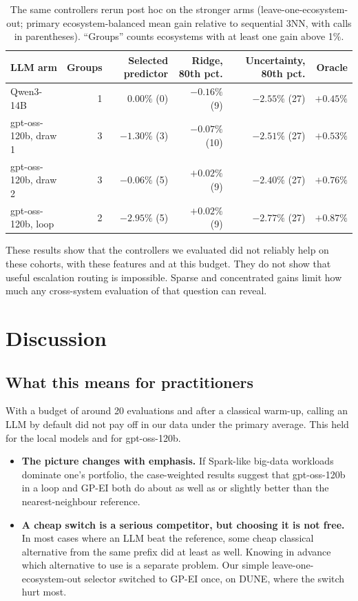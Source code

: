 \begin{table}[t]
\centering
\caption{The same controllers rerun post hoc on the stronger arms (leave-one-ecosystem-out; primary ecosystem-balanced mean gain relative to sequential 3NN, with calls in parentheses). ``Groups'' counts ecosystems with at least one gain above 1\%.}
\label{tab:routers-strong}
\small
\begin{tabular}{lrrrrr}
\toprule
LLM arm & Groups & Selected predictor & Ridge, 80th pct. & Uncertainty, 80th pct. & Oracle \\
\midrule
Qwen3-14B & 1 & $0.00\%$ (0) & $-0.16\%$ (9) & $-2.55\%$ (27) & $+0.45\%$ \\
gpt-oss-120b, draw 1 & 3 & $-1.30\%$ (3) & $-0.07\%$ (10) & $-2.51\%$ (27) & $+0.53\%$ \\
gpt-oss-120b, draw 2 & 3 & $-0.06\%$ (5) & $+0.02\%$ (9) & $-2.40\%$ (27) & $+0.76\%$ \\
gpt-oss-120b, loop & 2 & $-2.95\%$ (5) & $+0.02\%$ (9) & $-2.77\%$ (27) & $+0.87\%$ \\
\bottomrule
\end{tabular}
\end{table}

These results show that the controllers we evaluated did not reliably help on these cohorts, with these features and at this budget. They do not show that useful escalation routing is impossible. Sparse and concentrated gains limit how much any cross-system evaluation of that question can reveal.

\section{Discussion}

\subsection{What this means for practitioners}

With a budget of around 20 evaluations and after a classical warm-up, calling an LLM by default did not pay off in our data under the primary average. This held for the local models and for gpt-oss-120b.
\begin{itemize}
  \item \textbf{The picture changes with emphasis.} If Spark-like big-data workloads dominate one's portfolio, the case-weighted results suggest that gpt-oss-120b in a loop and GP-EI both do about as well as or slightly better than the nearest-neighbour reference.
  \item \textbf{A cheap switch is a serious competitor, but choosing it is not free.} In most cases where an LLM beat the reference, some cheap classical alternative from the same prefix did at least as well. Knowing in advance which alternative to use is a separate problem. Our simple leave-one-ecosystem-out selector switched to GP-EI once, on DUNE, where the switch hurt most.
\end{itemize}

